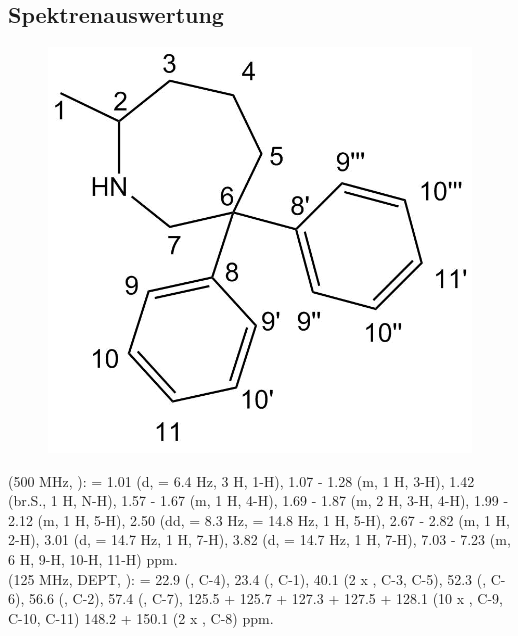 \documentclass[12pt]{article}
\begin{document}
\begin{onehalfspace}
\section{Spektrenauswertung}
\begin{figure}[!htbp]
   \centering
\includegraphics[scale=0.3]{auswert.png}
\end{figure}
\noindent
\textbf{} (500 MHz, ): \sffamily \ce{$\delta$} =
1.01 (d,  = 6.4 \si{\hertz}, 3 H, 1-H),
1.07 - 1.28 (m, 1 H, 3-H),
1.42 (br.S., 1 H, N-H),
1.57 - 1.67 (m, 1 H, 4-H),
1.69 - 1.87 (m, 2 H, 3-H, 4-H),
1.99 - 2.12 (m, 1 H, 5-H),
2.50 (dd,  = 8.3 \si{\hertz},  = 14.8 \si{\hertz}, 1 H, 5-H),
2.67 - 2.82 (m, 1 H, 2-H),
3.01 (d,  = 14.7 \si{\hertz}, 1 H, 7-H),
3.82 (d,  = 14.7 \si{\hertz}, 1 H, 7-H),
7.03 - 7.23 (m, 6 H, 9-H, 10-H, 11-H) ppm. \\
\noindent
\textbf{} (125 MHz, DEPT, ): \sffamily \ce{$\delta$} =
22.9 (, C-4),
23.4 (, C-1),
40.1 (2 x  , C-3, C-5),
52.3 (, C-6),
56.6 (, C-2),
57.4 (, C-7),
125.5 + 125.7 + 127.3 + 127.5 + 128.1 (10 x , C-9, C-10, C-11)
148.2 + 150.1 (2 x , C-8) ppm. \\

\end{onehalfspace}
\end{document}
